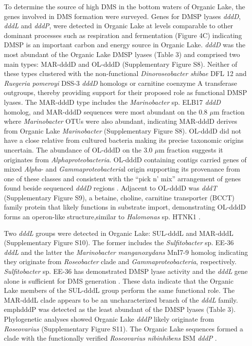 To determine the source of high \ac{DMS} in the bottom waters of Organic Lake, the genes involved in \ac{DMS} formation were surveyed.
 Genes for \ac{DMSP} lyases \emph{dddD}, \emph{dddL} and \emph{dddP}, were detected in Organic Lake at levels comparable to other dominant processes such as respiration and fermentation (Figure 4C) indicating \ac{DMSP} is an important carbon and energy source in Organic Lake. 
\emph{dddD} was the most abundant of the Organic Lake \ac{DMSP} lyases (Table 3) and comprised two main types: MAR-dddD and OL-dddD (Supplementary Figure S8). 
Neither of these types clustered with the non-functional \emph{Dinoroseobacter shibae} DFL 12 and \emph{Ruegeria pomeroyi} DSS-3 \emph{dddD} homologs \cite{Todd2011} or carnitine coenzyme A transferase outgroups, thereby providing support for their proposed role as functional \ac{DMSP} lyases. 
The MAR-dddD type includes the \emph{Marinobacter} sp. ELB17 \emph{dddD} homolog, and MAR-dddD sequences were most abundant on the 0.8 $\mu$m fraction where \emph{Marinobacter} \acp{OTU} were also abundant, indicating MAR-dddD derives from Organic Lake \emph{Marinobacter} (Supplementary Figure S8). 
OL-dddD did not have a close relative from cultured bacteria making its precise taxonomic origins uncertain. 
The abundance of OL-dddD on the 3.0 $\mu$m fraction suggests it originates from \emph{Alphaproteobacteria}. 
OL-dddD containing contigs carried genes of mixed \emph{Alpha}- and \emph{Gammaproteobacteria}l origin supporting its provenance from one of these classes and consistent with the ``pick n' mix'' arrangement of genes found beside sequenced \emph{dddD} regions \cite{Johnston2008}. 
Adjacent to OL-dddD was \emph{dddT} (Supplementary Figure S9), a betaine, choline, carnitine transporter (BCCT) family protein that likely functions in substrate import, demonstrating OL-dddD forms an operon-like structure,similar to \emph{Halomonas} sp. HTNK1 \cite{Todd2010}.

Two \emph{dddL} groups were detected in Organic Lake: SUL-dddL and MAR-dddL (Supplementary Figure S10). 
The former includes the \emph{Sulfitobacter} sp. EE-36 \emph{dddL} and the latter the \emph{Marinobacter manganoxydans} MnI7-9 homolog indicating they originate from \emph{Roseobacter} clade and \emph{Gammaproteobacteria}, respectively. 
\emph{Sulfitobacter} sp. EE-36 has demonstrated \ac{DMSP} lyase activity and the \emph{dddL} gene alone is sufficient for \ac{DMS} generation \cite{Curson2008}. 
These data indicate that the Organic Lake members of the SUL-dddL group perform the same functional role. 
The MAR-dddL clade appears to be an uncharacterized branch of the \emph{dddL} family. 
emph{dddP} was detected as the least abundant of the \ac{DMSP} lyases (Table 3). 
Phylogenetic analyses showed Organic Lake \emph{dddP} likely originate from \emph{Roseovarius} (Supplementary Figure S11). 
The Organic Lake sequences formed a clade with the functionally verified \emph{Roseovarius nibinhibens} ISM \emph{dddP} \cite{Todd2009}. 

